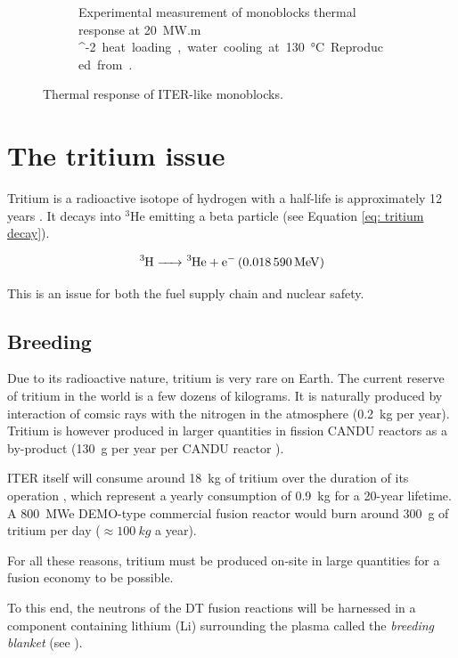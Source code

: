 \begin{figure} [h]
\begin{subfigure}[t]{0.45\linewidth}
            \caption{Experimental measurement of monoblocks thermal response at \SI{20}{MW.m ^{-2}} heat loading, water cooling at \SI{130}{\celsius}. Reproduced from \cite{visca_manufacturing_2018}.}
    \end{subfigure}
    \caption{Thermal response of ITER-like monoblocks.}
\end{figure}

\section{The tritium issue} \label{the tritium issue}

Tritium is a radioactive isotope of hydrogen with a half-life is approximately 12 years .
It decays into $^3$He emitting a beta particle (see Equation \ref{eq: tritium decay}).

\begin{equation}
    \ce{^3H -> ^3He + e^- (\SI{0.018590}{MeV})}
    \label{eq: tritium decay}
\end{equation}

This is an issue for both the fuel supply chain and nuclear safety.

\subsection{Breeding}
Due to its radioactive nature, tritium is very rare on Earth.
The current reserve of tritium in the world is a few dozens of kilograms.
It is naturally produced by interaction of comsic rays with the nitrogen in the atmosphere (\SI{0.2}{kg} per year).
Tritium is however produced in larger quantities in fission CANDU reactors as a by-product (\SI{130}{g} per year per CANDU reactor ).

ITER itself will consume around \SI{18}{kg} of tritium over the duration of its operation , which represent a yearly consumption of \SI{0.9}{kg} for a 20-year lifetime.
A \SI{800}{MWe} DEMO-type commercial fusion reactor would burn around \SI{300}{g} of tritium per day ($\approx \SI{100}{kg}$ a year).

For all these reasons, tritium must be produced on-site in large quantities for a fusion economy to be possible.

To this end, the neutrons of the DT fusion reactions will be harnessed in a component containing lithium (Li) surrounding the plasma called the \textit{breeding blanket} (see ).


